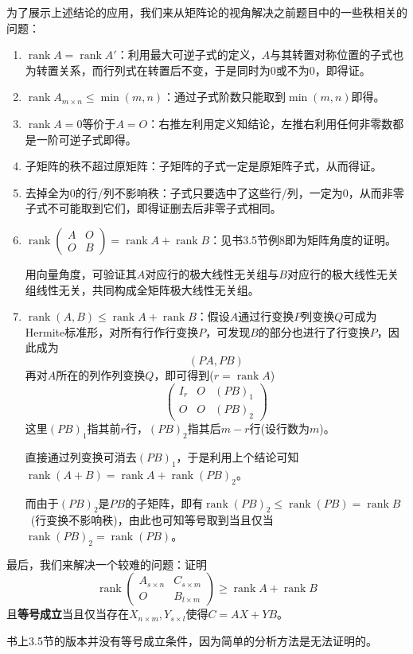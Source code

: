 \documentclass[a4paper,UTF8,fontset=windows]{ctexart}
\DeclareMathOperator{\rank}{rank}
\newcommand*{\note}{\noindent *}
\begin{document}
为了展示上述结论的应用，我们来从矩阵论的视角解决之前题目中的一些秩相关的问题：
\begin{enumerate}
    \item $\rank A=\rank A'$：利用最大可逆子式的定义，$A$与其转置对称位置的子式也为转置关系，而行列式在转置后不变，于是同时为0或不为0，即得证。
    \item $\rank A_{m\times n}\le\min(m,n)$：通过子式阶数只能取到$\min(m,n)$即得。
    \item $\rank A=0$等价于$A=O$：右推左利用定义知结论，左推右利用任何非零数都是一阶可逆子式即得。
    \item 子矩阵的秩不超过原矩阵：子矩阵的子式一定是原矩阵子式，从而得证。
    \item 去掉全为0的行/列不影响秩：子式只要选中了这些行/列，一定为0，从而非零子式不可能取到它们，即得证删去后非零子式相同。
    \item $\rank\begin{pmatrix}A&O\\O&B\end{pmatrix}=\rank A+\rank B$：见书3.5节例8即为矩阵角度的证明。
    
    \note 用向量角度，可验证其$A$对应行的极大线性无关组与$B$对应行的极大线性无关组线性无关，共同构成全矩阵极大线性无关组。
    \item $\rank(A,B)\le\rank A+\rank B$：假设$A$通过行变换$P$列变换$Q$可成为Hermite标准形，对所有行作行变换$P$，可发现$B$的部分也进行了行变换$P$，因此成为
    $$(PA,PB)$$
    再对$A$所在的列作列变换$Q$，即可得到($r=\rank A$)
    $$\begin{pmatrix}I_r&O&(PB)_1\\O&O&(PB)_2\end{pmatrix}$$
    这里$(PB)_1$指其前$r$行，$(PB)_2$指其后$m-r$行(设行数为$m$)。

    直接通过列变换可消去$(PB)_1$，于是利用上个结论可知$\rank(A+B)=\rank A+\rank(PB)_2$。

    而由于$(PB)_2$是$PB$的子矩阵，即有$\rank(PB)_2\le\rank(PB)=\rank B$\ (行变换不影响秩)，由此也可知等号取到当且仅当$\rank(PB)_2=\rank(PB)$。
\end{enumerate}

最后，我们来解决一个较难的问题：证明
$$\rank\begin{pmatrix}A_{s\times n}&C_{s\times m}\\O&B_{l\times m}\end{pmatrix}\ge\rank A+\rank B$$
且\textbf{等号成立}当且仅当存在$X_{n\times m},Y_{s\times l}$使得$C=AX+YB$。

\note 书上3.5节的版本并没有等号成立条件，因为简单的分析方法是无法证明的。
\end{document}
